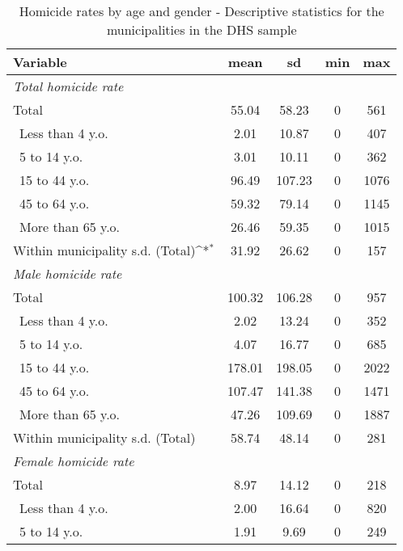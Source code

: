\documentclass[a4paper,10pt,twocolumn,preprint,3p,authoryear]{elsarticle}
\def\sym#1{\ifmmode^{#1}\else\(^{#1}\)\fi}
\begin{document}
\begin{table}[h]
	\caption{\\ Homicide rates by age and gender - Descriptive statistics for the municipalities in the DHS sample}	
	\footnotesize
	\centering
\begin{tabular}{l cccc}
\hline
            Variable&        mean&          sd&         min&         max\\
\hline
\multicolumn{5}{l}{{\emph{Total homicide rate}}}  \\
Total &       55.04&       58.23&           0&         561\\
\ Less than 4 y.o.&        2.01&       10.87&           0&         407\\
\ 5 to 14 y.o.&        3.01&       10.11&           0&         362\\
\ 15 to 44 y.o.&       96.49&      107.23&           0&        1076\\
\ 45 to 64 y.o.&       59.32&       79.14&           0&        1145\\
\ More than 65 y.o.&       26.46&       59.35&           0&        1015\\
Within municipality s.d. (Total)\sym{*}&       31.92&       26.62&           0&         157\\ \hline
\multicolumn{5}{l}{{\emph{Male homicide rate}}}  \\
Total &      100.32&      106.28&           0&         957\\
\ Less than 4 y.o.&        2.02&       13.24&           0&         352\\
\ 5 to 14 y.o.&        4.07&       16.77&           0&         685\\
\ 15 to 44 y.o.&      178.01&      198.05&           0&        2022\\
\ 45 to 64 y.o.&      107.47&      141.38&           0&        1471\\
\ More than 65 y.o.&       47.26&      109.69&           0&        1887\\
Within municipality s.d. (Total)&       58.74&       48.14&           0&         281\\ \hline
\multicolumn{5}{l}{{\emph{Female homicide rate}}}  \\
Total&        8.97&       14.12&           0&         218\\
\ Less than 4 y.o.&        2.00&       16.64&           0&         820\\
\ 5 to 14 y.o.&        1.91&        9.69&           0&         249\\

\end{tabular}
\end{table}
\end{document}
